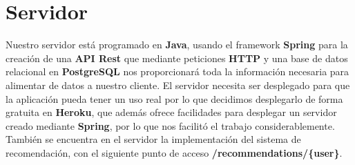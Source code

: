 \section{Servidor}
\label{makereference4.2}
Nuestro servidor está programado en \textbf{Java}, usando el framework \textbf{Spring} para la creación de una \textbf{API Rest} que mediante peticiones \textbf{HTTP} y una base de datos relacional en \textbf{PostgreSQL} nos proporcionará
toda la información necesaria para alimentar de datos a nuestro cliente. El servidor necesita ser desplegado para que la aplicación pueda tener un uso real por lo que decidimos desplegarlo de forma gratuita en \textbf{Heroku}, que además ofrece
facilidades para desplegar un servidor creado mediante \textbf{Spring}, por lo que nos facilitó el trabajo considerablemente. También se encuentra en el servidor la implementación del sistema de recomendación, con el siguiente punto de acceso \textbf{/recommendations/\{user\}}.
